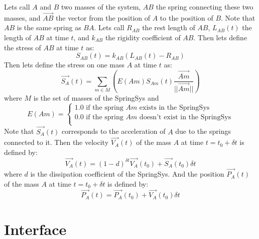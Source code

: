 \documentclass[12pt, a4paper]{article}
\begin{document}
Lets call $A$ and $B$ two masses of the system, $AB$ the spring connecting these two masses, and $\overrightarrow{AB}$ the vector from the position of $A$ to the position of $B$. Note that $AB$ is the same spring as $BA$. Lets call $R_{AB}$ the rest length of $AB$, $L_{AB}(t)$ the length of $AB$ at time $t$, and $k_{AB}$ the rigidity coefficient of $AB$. Then lets define the stress of $AB$ at time $t$ as:\\
$$
S_{AB}(t) = k_{AB}(L_{AB}(t)-R_{AB})
$$
Then lets define the stress on one mass $A$ at time $t$ as:\\
$$
\overrightarrow{S_A}(t) = \sum_{m\in M}\left(E(Am)S_{Am}(t)\frac{\overrightarrow{Am}}{||\overrightarrow{Am}||}\right)
$$
where $M$ is the set of masses of the SpringSys and 
$$
E(Am)=\left\lbrace
\begin{array}{l}
1.0\textrm{ if the spring }Am\textrm{ exists in the SpringSys}\\
0.0\textrm{ if the spring }Am\textrm{ doesn't exist in the SpringSys}\\
\end{array}
\right.
$$
Note that $\overrightarrow{S_A}(t)$ corresponds to the acceleration of $A$ due to the springs connected to it. Then the velocity $\overrightarrow{V_A}(t)$ of the mass $A$ at time $t=t_0+\delta t$ is defined by:\\
$$
\overrightarrow{V_A}(t)=(1-d)^{\delta t}\overrightarrow{V_A}(t_0)+\overrightarrow{S_A}(t_0)\delta t
$$
where $d$ is the dissipation coefficient of the SpringSys.
And the position $\overrightarrow{P_A}(t)$ of the mass $A$ at time $t=t_0+\delta t$ is defined by:\\
$$
\overrightarrow{P_A}(t)=\overrightarrow{P_A}(t_0)+\overrightarrow{V_A}(t_0)\delta t
$$

\section{Interface}
\end{document}
